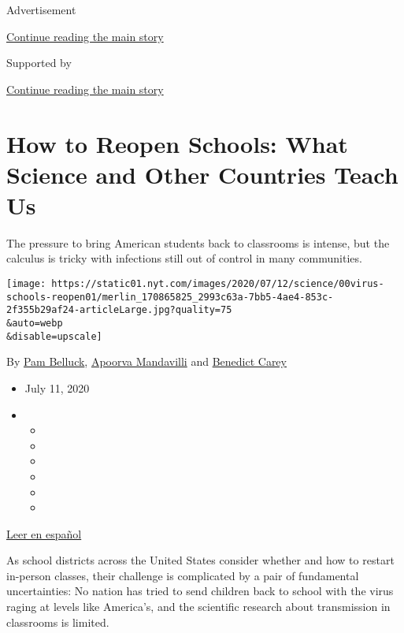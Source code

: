 Advertisement

\protect\hyperlink{after-top}{Continue reading the main story}

Supported by

\protect\hyperlink{after-sponsor}{Continue reading the main story}

\hypertarget{how-to-reopen-schools-what-science-and-other-countries-teach-us}{%
\section{How to Reopen Schools: What Science and Other Countries Teach
Us}\label{how-to-reopen-schools-what-science-and-other-countries-teach-us}}

The pressure to bring American students back to classrooms is intense,
but the calculus is tricky with infections still out of control in many
communities.

\texttt{[image: https://static01.nyt.com/images/2020/07/12/science/00virus-schools-reopen01/merlin\_170865825\_2993c63a-7bb5-4ae4-853c-2f355b29af24-articleLarge.jpg?quality=75\\\&auto=webp\\\&disable=upscale]}

By \href{https://www.nytimes.com/by/pam-belluck}{Pam Belluck},
\href{https://www.nytimes.com/by/apoorva-mandavilli}{Apoorva Mandavilli}
and \href{https://www.nytimes.com/by/benedict-carey}{Benedict Carey}

\begin{itemize}
\item
  July 11, 2020
\item
  \begin{itemize}
  \item
  \item
  \item
  \item
  \item
  \item
  \end{itemize}
\end{itemize}

\href{https://www.nytimes.com/es/2020/07/27/espanol/ciencia-y-tecnologia/regreso-a-clases-coronavirus.html}{Leer
en español}

As school districts across the United States consider whether and how to
restart in-person classes, their challenge is complicated by a pair of
fundamental uncertainties: No nation has tried to send children back to
school with the virus raging at levels like America's, and the
scientific research about transmission in classrooms is limited.

